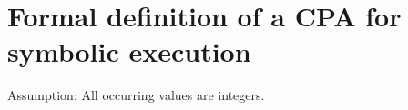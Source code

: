 \newcommand{\symex}{\mathbb{S}}
\newcommand{\constantprop}{\mathbb{CO}}
\newcommand{\constraints}{\mathbb{C}}
\newcommand{\location}{\mathbb{L}}
\newcommand{\composition}{\mathscr{C}}

\newcommand{\transfer}{\rightsquigarrow}
\newcommand{\gtransfer}{\overset{g}{\transfer}}
\newcommand{\strengthen}{\downarrow}

\newcommand{\valueset}{\mathscr{Z}}
\newcommand{\integerset}{\mathbb{Z}}

\newcommand{\symlattice}{\mathscr{E}}
\newcommand{\symidset}{S_I}
\newcommand{\symexpset}{S_E}

\newcommand{\constraintlattice}{\mathscr{C}}

\newcommand{\llbracket}{[\![}
\newcommand{\rrbracket}{]\!]}
\newcommand{\concretization}{\llbracket \cdot \rrbracket}
\newcommand{\lesserEqual}{\sqsubseteq}
\newcommand{\leastupperbound}{\sqcup}

\renewcommand{\or}{\vee}
\newcommand{\satisfies}{\vDash}

\section{Formal definition of a CPA for symbolic execution}
Assumption: All occurring values are integers.

